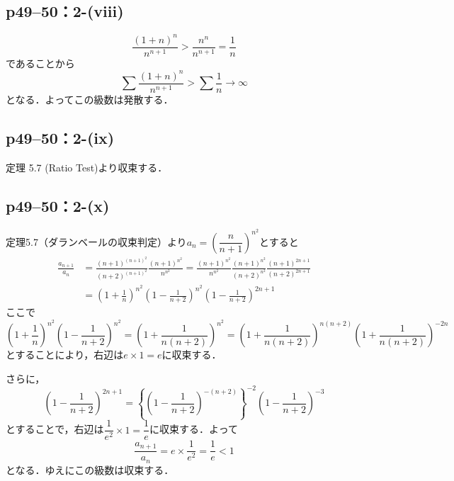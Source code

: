 \subsection*{p49--50：2-(viii)}

\begin{tanswer}
    \[
        \frac{(1+n)^n}{n^{n+1}}>\frac{n^n}{n^{n+1}}=\frac{1}{n}
    \]
    であることから
    \[
        \sum \frac{(1+n)^n}{n^{n+1}}>\sum \frac{1}{n} \rightarrow \infty
    \]
    となる．よってこの級数は発散する．
\end{tanswer}


\subsection*{p49--50：2-(ix)}

\begin{tanswer}
    定理 5.7 (Ratio Test)より収束する．
\end{tanswer}

\subsection*{p49--50：2-(x)} \label{p49--50：2-(x)}

\begin{tanswer}
    定理5.7（ダランベールの収束判定）より$a_n=\left(\dfrac{n}{n+1}\right)^{n^2}$とすると
    \begin{align*}
        \frac{a_{n+1}}{a_n} & =\frac{(n+1)^{(n+1)^2}}{(n+2)^{(n+1)^2}}\frac{(n+1)^{n^2}}{n^{n^2}}=\frac{(n+1)^{n^2}}{n^{n^2}}\frac{(n+1)^{n^2}}{(n+2)^{n^2}}\frac{(n+1)^{2n+1}}{(n+2)^{2n+1}} \\
                            & =\left(1+\frac{1}{n}\right)^{n^2}\left(1-\frac{1}{n+2}\right)^{n^2}\left(1-\frac{1}{n+2}\right)^{2n+1}
    \end{align*}
    ここで
    \[
        \left(1+\frac{1}{n}\right)^{n^2}\left(1-\frac{1}{n+2}\right)^{n^2}=\left(1+\frac{1}{n(n+2)}\right)^{n^2}=\left(1+\frac{1}{n(n+2)}\right)^{n(n+2)}\left(1+\frac{1}{n(n+2)}\right)^{-2n}
    \]
    とすることにより，右辺は$e \times 1=e$に収束する．

    さらに，
    \[
        \left(1-\frac{1}{n+2}\right)^{2n+1}=\left\{\left(1-\frac{1}{n+2}\right)^{-(n+2)}\right\}^{-2}\left(1-\frac{1}{n+2}\right)^{-3}
    \]
    とすることで，右辺は$\dfrac{1}{e^2} \times 1=\dfrac{1}{e}$に収束する．よって
    \[
        \frac{a_{n+1}}{a_n}=e \times \frac{1}{e^2}=\frac{1}{e}<1
    \]
    となる．ゆえにこの級数は収束する．
\end{tanswer}

